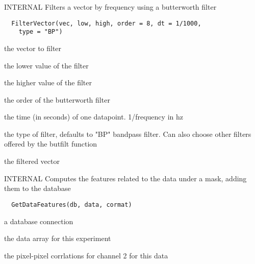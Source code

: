 \documentclass[a4paper]{book}
\begin{document}
%
\begin{Description}\relax
INTERNAL Filters a vector by frequency using a
butterworth filter
\end{Description}
%
\begin{Usage}
\begin{verbatim}
  FilterVector(vec, low, high, order = 8, dt = 1/1000,
    type = "BP")
\end{verbatim}
\end{Usage}
%
\begin{Arguments}
\begin{ldescription}
\item[\code{vec}] the vector to filter

\item[\code{low}] the lower value of the filter

\item[\code{high}] the higher value of the filter

\item[\code{order}] the order of the butterworth filter

\item[\code{dt}] the time (in seconds) of one datapoint.
1/frequency in hz

\item[\code{type}] the type of filter, defaults to "BP" bandpass
filter. Can also choose other filters offered by the
butfilt function
\end{ldescription}
\end{Arguments}
%
\begin{Value}
the filtered vector
\end{Value}
%
\begin{Description}\relax
INTERNAL Computes the features related to the data under
a mask, adding them to the database
\end{Description}
%
\begin{Usage}
\begin{verbatim}
  GetDataFeatures(db, data, cormat)
\end{verbatim}
\end{Usage}
%
\begin{Arguments}
\begin{ldescription}
\item[\code{db}] a database connection

\item[\code{data}] the data array for this experiment

\item[\code{cormat}] the pixel-pixel corrlations for channel 2
for this data
\end{ldescription}
\end{Arguments}
\end{document}
